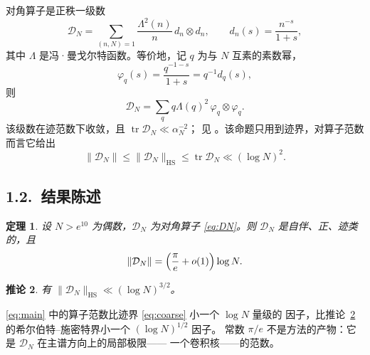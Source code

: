 \documentclass[12pt,a4paper]{amsart}
\numberwithin{equation}{section}
\theoremstyle{plain}
\newtheorem{theorem}{定理}[section]
\newtheorem{corollary}[theorem]{推论}
\theoremstyle{definition}
\newcommand{\HS}{\mathrm{HS}}
\begin{document}
对角算子是正秩一级数
\begin{equation}\label{eq:DN}
 \mathcal D_N=\sum_{(n,N)=1}\frac{\Lambda^2(n)}{n}\,d_n\otimes d_n,
 \qquad d_n(s)=\frac{n^{-s}}{1+s},
\end{equation}
其中 $\Lambda$ 是冯·曼戈尔特函数。等价地，记 $q$ 为与 $N$ 互素的素数幂，
\begin{equation}\label{eq:phiq}
 \varphi_q(s)=\frac{q^{-1-s}}{1+s}=q^{-1}d_q(s),
\end{equation}
则
\begin{equation}\label{eq:DN2}
 \mathcal D_N=\sum_{q}q\Lambda(q)^2\,\varphi_q\otimes\varphi_q .
\end{equation}
该级数在迹范数下收敛，且 $\operatorname{tr}\mathcal D_N\ll\alpha_N^{-2}$；
见 \cite[命题 6.5]{LL}。该命题只用到迹界，对算子范数而言它给出
\begin{equation}\label{eq:coarse}
 \|\mathcal D_N\|\le\|\mathcal D_N\|_{\HS}\le\operatorname{tr}\mathcal D_N
 \ll(\log N)^2 .
\end{equation}

\subsection*{1.2.\ 结果陈述}

\begin{theorem}\label{thm:main}
设 $N>e^{10}$ 为偶数，$\mathcal D_N$ 为对角算子 \eqref{eq:DN}。则
$\mathcal D_N$ 是自伴、正、迹类的，且
\begin{equation}\label{eq:main}
 \|\mathcal D_N\|=\Bigl(\frac{\pi}{e}+o(1)\Bigr)\log N .
\end{equation}
\end{theorem}

\begin{corollary}\label{cor:HS}
有 $\|\mathcal D_N\|_{\HS}\ll(\log N)^{3/2}$。
\end{corollary}

\eqref{eq:main} 中的算子范数比迹界 \eqref{eq:coarse} 小一个 $\log N$ 量级的
因子，比推论~\ref{cor:HS} 的希尔伯特--施密特界小一个 $(\log N)^{1/2}$ 因子。
常数 $\pi/e$ 不是方法的产物：它是 $\mathcal D_N$ 在主谱方向上的局部极限——
一个卷积核——的范数。
\end{document}
